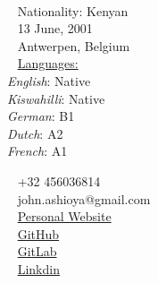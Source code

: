 \documentclass{modernsimplecv}
\begin{document}
\begin{minipage}[t]{0.77\textwidth}
\vspace{0pt} %
\begin{shaded*}

\begin{minipage}[t]{0.4\textwidth}
\vspace{0pt} %
{\par\centering\huge{}} \\[0.3cm]
\faGlobe~ Nationality: Kenyan\\
\faBirthdayCake~ 13 June, 2001 \\
\faMapMarker~ Antwerpen, Belgium\\

{\small
\faCommentsO~ \underline{Languages:} \\ 
\emph{English}: Native \\ 
\emph{Kiswahilli}: Native \\ 
\emph{German}: B1 \\ 
\emph{Dutch}: A2\\
\emph{French}: A1\\}
\end{minipage}\hfill
\begin{minipage}[t]{0.55\textwidth}
\vspace{0pt} %
\faPhone~ +32 456036814 \\
\faAt~ {john.ashioya@gmail.com} \\


\faFont~ \href{https://paul-ashioya.com }{Personal Website} \\
\faGithub~ \href{https://github.com/pashioya}{GitHub} \\
\faGitlab~ \href{https://gitlab.com/pashioya}{GitLab} \\
\faLinkedin~ \href{https://linkedin.com/in/paul-ashioya-1b1023153/}{Linkdin} \\



\end{minipage}
\hfill
\end{shaded*}
\end{minipage}\\[15pt]
\end{document}
